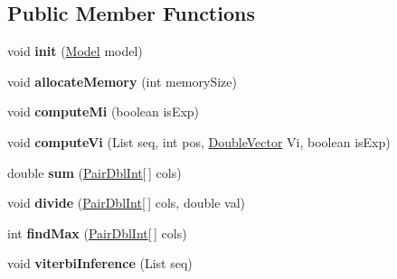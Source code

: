 \subsection*{Public Member Functions}
\begin{DoxyCompactItemize}
\item 
\hypertarget{classcrf_1_1tagger_1_1Viterbi_ae3baad39c4b24c4f3f065bba57167c4b}{
void {\bfseries init} (\hyperlink{classcrf_1_1tagger_1_1Model}{Model} model)}
\label{classcrf_1_1tagger_1_1Viterbi_ae3baad39c4b24c4f3f065bba57167c4b}

\item 
\hypertarget{classcrf_1_1tagger_1_1Viterbi_a1e42fc249057c161622e23b08b2c1dda}{
void {\bfseries allocateMemory} (int memorySize)}
\label{classcrf_1_1tagger_1_1Viterbi_a1e42fc249057c161622e23b08b2c1dda}

\item 
\hypertarget{classcrf_1_1tagger_1_1Viterbi_a0c0a25b634913a82332c30415409f5bc}{
void {\bfseries computeMi} (boolean isExp)}
\label{classcrf_1_1tagger_1_1Viterbi_a0c0a25b634913a82332c30415409f5bc}

\item 
\hypertarget{classcrf_1_1tagger_1_1Viterbi_a49955d4139c99c1edfd9451b55b70395}{
void {\bfseries computeVi} (List seq, int pos, \hyperlink{classcrf_1_1tagger_1_1DoubleVector}{DoubleVector} Vi, boolean isExp)}
\label{classcrf_1_1tagger_1_1Viterbi_a49955d4139c99c1edfd9451b55b70395}

\item 
\hypertarget{classcrf_1_1tagger_1_1Viterbi_af419f94e3b4d329c943cb51fc48b58b2}{
double {\bfseries sum} (\hyperlink{classcrf_1_1tagger_1_1Viterbi_1_1PairDblInt}{PairDblInt}\mbox{[}$\,$\mbox{]} cols)}
\label{classcrf_1_1tagger_1_1Viterbi_af419f94e3b4d329c943cb51fc48b58b2}

\item 
\hypertarget{classcrf_1_1tagger_1_1Viterbi_a6c40e41ee59945d99c1537ef5108276e}{
void {\bfseries divide} (\hyperlink{classcrf_1_1tagger_1_1Viterbi_1_1PairDblInt}{PairDblInt}\mbox{[}$\,$\mbox{]} cols, double val)}
\label{classcrf_1_1tagger_1_1Viterbi_a6c40e41ee59945d99c1537ef5108276e}

\item 
\hypertarget{classcrf_1_1tagger_1_1Viterbi_a0f09bb9fe9a6e23869f2b603faa4b1e2}{
int {\bfseries findMax} (\hyperlink{classcrf_1_1tagger_1_1Viterbi_1_1PairDblInt}{PairDblInt}\mbox{[}$\,$\mbox{]} cols)}
\label{classcrf_1_1tagger_1_1Viterbi_a0f09bb9fe9a6e23869f2b603faa4b1e2}

\item 
\hypertarget{classcrf_1_1tagger_1_1Viterbi_ad605cbfce3f7fbe958e5635cf47f635a}{
void {\bfseries viterbiInference} (List seq)}
\label{classcrf_1_1tagger_1_1Viterbi_ad605cbfce3f7fbe958e5635cf47f635a}

\end{DoxyCompactItemize}
